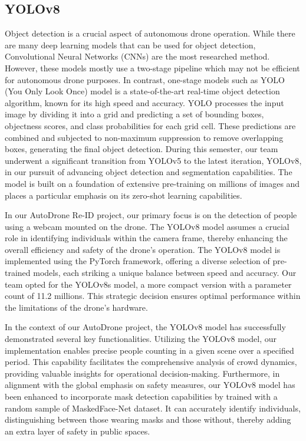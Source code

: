 \subsection{YOLOv8}\label{subsection:C}
Object detection is a crucial aspect of autonomous drone operation. While there are many deep learning models that can be used for object detection, Convolutional Neural Networks (CNNs) are the most researched method. However, these models mostly use a two-stage pipeline which may not be efficient for autonomous drone purposes. In contrast, one-stage models such as YOLO (You Only Look Once) \cite{2c1} model is a state-of-the-art real-time object detection algorithm, known for its high speed and accuracy. YOLO processes the input image by dividing it into a grid and predicting a set of bounding boxes, objectness scores, and class probabilities for each grid cell. These predictions are combined and subjected to non-maximum suppression to remove overlapping boxes, generating the final object detection. During this semester, our team underwent a significant transition from YOLOv5\cite{2c2} to the latest iteration, YOLOv8\cite{2c3}, in our pursuit of advancing object detection and segmentation capabilities. The model is built on a foundation of extensive pre-training on millions of images and places a particular emphasis on its zero-shot learning capabilities.

In our AutoDrone Re-ID project, our primary focus is on the detection of people using a webcam mounted on the drone. The YOLOv8 model assumes a crucial role in identifying individuals within the camera frame, thereby enhancing the overall efficiency and safety of the drone's operation. The YOLOv8 model is implemented using the PyTorch framework, offering a diverse selection of pre-trained models, each striking a unique balance between speed and accuracy. Our team opted for the YOLOv8s model, a more compact version with a parameter count of 11.2 millions. This strategic decision ensures optimal performance within the limitations of the drone's hardware.

In the context of our AutoDrone project, the YOLOv8 model has successfully demonstrated several key functionalities. Utilizing the YOLOv8 model, our implementation enables precise people counting in a given scene over a specified period. This capability facilitates the comprehensive analysis of crowd dynamics, providing valuable insights for operational decision-making. Furthermore, in alignment with the global emphasis on safety measures, our YOLOv8 model has been enhanced to incorporate mask detection capabilities by trained with a random sample of MaskedFace-Net dataset\cite{2c4}. It can accurately identify individuals, distinguishing between those wearing masks and those without, thereby adding an extra layer of safety in public spaces.